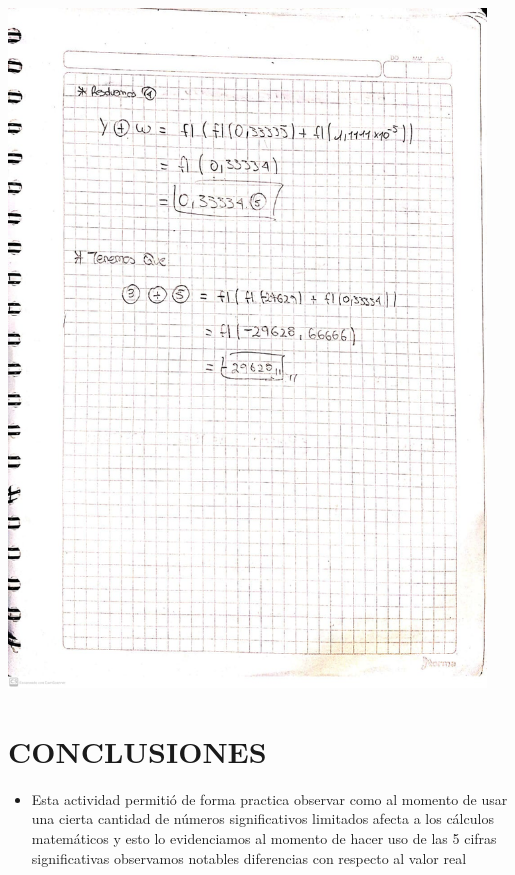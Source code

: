 \documentclass[12pt]{article}
\begin{document}
\begin{minipage}{0.95\textwidth}
    \raggedleft
    \includegraphics[width=0.95\textwidth]{inFiles/Figures/ej3.jpeg}
\end{minipage}

\vspace{3cm}

\section*{CONCLUSIONES}
\begin{itemize}
    \item {Esta actividad permitió  de forma practica observar como al momento de usar
    una cierta cantidad de números significativos limitados afecta a los cálculos matemáticos y esto lo evidenciamos al momento de hacer
    uso de las 5 cifras significativas observamos notables diferencias con respecto al valor real
    }
\end{itemize}


\vspace{0.5cm}
\end{document}
